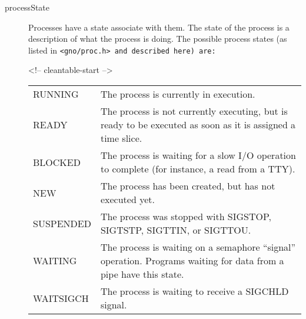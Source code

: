 \documentclass{report}
\begin{document}
\begin{description}

\item[processState]
Processes have a
state associate with them. The state of the process is a
description of what the process is doing. The possible process
states (as listed in 
\tt <gno/proc.h> \rm
and described here) are:

\begin{rawhtml}
<!-- cleantable-start -->
\end{rawhtml}

\begin{tabular}{ll}

RUNNING 	&
\begin{minipage}[t]{8cm}
	The process is currently in execution.
\end{minipage} \hfill \\

READY 	&
\begin{minipage}[t]{8cm}
	The process is not currently executing, but is ready to be
	executed as soon as it is assigned a time slice.
\end{minipage} \hfill \\

BLOCKED	&
\begin{minipage}[t]{8cm}
	\index{blocked processes}
	The process is waiting for a slow I/O operation to
	complete (for instance, a read from a TTY).
\end{minipage} \hfill \\

NEW 	&
\begin{minipage}[t]{8cm}
	The process has been created, but has not executed yet.
\end{minipage} \hfill \\

SUSPENDED  &
\begin{minipage}[t]{8cm}
	The process was stopped with SIGSTOP, SIGTSTP,
	SIGTTIN, or SIGTTOU.
\end{minipage} \hfill \\

WAITING  &
\begin{minipage}[t]{8cm}
	The process is waiting on a semaphore ``signal'' operation.
	Programs waiting for data from a pipe have this state.
\end{minipage} \hfill \\

WAITSIGCH  &
\begin{minipage}[t]{8cm}
	The process is waiting to receive a SIGCHLD signal.
\end{minipage} \hfill \\


\end{tabular}
\end{description}
\end{document}
